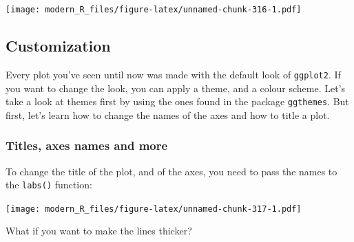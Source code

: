 \documentclass[]{gitbook}
\newenvironment{Shaded}{\begin{snugshade}}{\end{snugshade}}
\newcommand{\DataTypeTok}[1]{\textcolor[rgb]{0.13,0.29,0.53}{#1}}
\newcommand{\KeywordTok}[1]{\textcolor[rgb]{0.13,0.29,0.53}{\textbf{#1}}}
\newcommand{\NormalTok}[1]{#1}
\newcommand{\OperatorTok}[1]{\textcolor[rgb]{0.81,0.36,0.00}{\textbf{#1}}}
\newcommand{\StringTok}[1]{\textcolor[rgb]{0.31,0.60,0.02}{#1}}
\theoremstyle{definition}
\theoremstyle{definition}
\theoremstyle{definition}
\theoremstyle{remark}
\begin{document}
\texttt{[image: modern\_R\_files/figure-latex/unnamed-chunk-316-1.pdf]}

\hypertarget{customization}{%
\subsection{Customization}\label{customization}}

Every plot you've seen until now was made with the default look of
\texttt{ggplot2}. If you want to change the look, you can apply a theme,
and a colour scheme. Let's take a look at themes first by using the ones
found in the package \texttt{ggthemes}. But first, let's learn how to
change the names of the axes and how to title a plot.

\hypertarget{titles-axes-names-and-more}{%
\subsubsection{Titles, axes names and
more}\label{titles-axes-names-and-more}}

To change the title of the plot, and of the axes, you need to pass the
names to the \texttt{labs()} function:

\begin{Shaded}
\end{Shaded}

\texttt{[image: modern\_R\_files/figure-latex/unnamed-chunk-317-1.pdf]}

What if you want to make the lines thicker?
\end{document}
